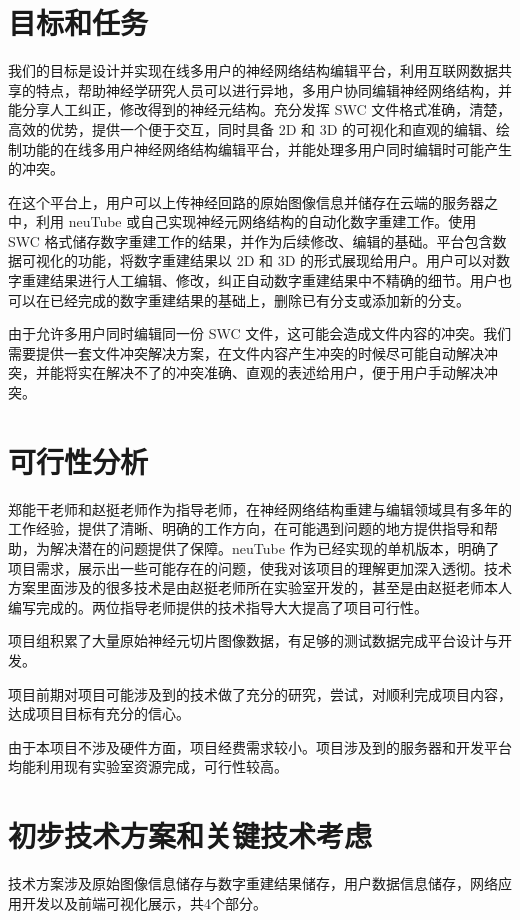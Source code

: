 {\section{目标和任务}
我们的目标是设计并实现在线多用户的神经网络结构编辑平台，利用互联网数据共享的特点，帮助神经学研究人员可以进行异地，多用户协同编辑神经网络结构，并能分享人工纠正，修改得到的神经元结构。充分发挥 SWC 文件格式准确，清楚，高效的优势，提供一个便于交互，同时具备 2D 和 3D 的可视化和直观的编辑、绘制功能的在线多用户神经网络结构编辑平台，并能处理多用户同时编辑时可能产生的冲突。

在这个平台上，用户可以上传神经回路的原始图像信息并储存在云端的服务器之中，利用 neuTube 或自己实现神经元网络结构的自动化数字重建工作。使用 SWC 格式储存数字重建工作的结果，并作为后续修改、编辑的基础。平台包含数据可视化的功能，将数字重建结果以 2D 和 3D 的形式展现给用户。用户可以对数字重建结果进行人工编辑、修改，纠正自动数字重建结果中不精确的细节。用户也可以在已经完成的数字重建结果的基础上，删除已有分支或添加新的分支。

由于允许多用户同时编辑同一份 SWC 文件，这可能会造成文件内容的冲突。我们需要提供一套文件冲突解决方案，在文件内容产生冲突的时候尽可能自动解决冲突，并能将实在解决不了的冲突准确、直观的表述给用户，便于用户手动解决冲突。

\section{可行性分析}
郑能干老师和赵挺老师作为指导老师，在神经网络结构重建与编辑领域具有多年的工作经验，提供了清晰、明确的工作方向，在可能遇到问题的地方提供指导和帮助，为解决潜在的问题提供了保障。neuTube 作为已经实现的单机版本，明确了项目需求，展示出一些可能存在的问题，使我对该项目的理解更加深入透彻。技术方案里面涉及的很多技术是由赵挺老师所在实验室开发的，甚至是由赵挺老师本人编写完成的。两位指导老师提供的技术指导大大提高了项目可行性。

项目组积累了大量原始神经元切片图像数据，有足够的测试数据完成平台设计与开发。

项目前期对项目可能涉及到的技术做了充分的研究，尝试，对顺利完成项目内容，达成项目目标有充分的信心。

由于本项目不涉及硬件方面，项目经费需求较小。项目涉及到的服务器和开发平台均能利用现有实验室资源完成，可行性较高。

\section{初步技术方案和关键技术考虑}
技术方案涉及原始图像信息储存与数字重建结果储存，用户数据信息储存，网络应用开发以及前端可视化展示，共4个部分。

}
